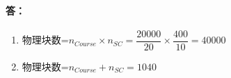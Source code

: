 \paragraph{答：}
\begin{enumerate}
	\item 
	物理块数=$n_{Course} \times n_{SC} = \dfrac{20000}{20} \times \dfrac{400}{10} = 40000$
	\item
	物理块数=$n_{Course} + n_{SC} = 1040$ 
\end{enumerate}